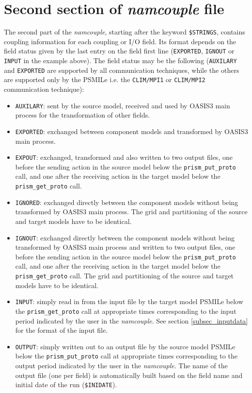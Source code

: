 \section{Second section of {\it namcouple} file }
\label{subsec_namcouplesecond}

The second part of the {\it namcouple}, starting after the keyword
{\tt \$STRINGS}, contains coupling information for each coupling or
I/O field.  Its format depends on the field status given by the last
entry on the field first line ({\tt EXPORTED}, {\tt IGNOUT} or {\tt
INPUT} in the example above). The field status may be the following
({\tt AUXILARY} and {\tt EXPORTED} are supported by all communication
techniques, while the others are supported only by the PSMILe i.e. the
{\tt CLIM/MPI1} or {\tt CLIM/MPI2} communication technique):

\begin{itemize}
\item {\tt AUXILARY}: sent by the source model, received and used by
  OASIS3 main process for the transformation of other fields.
\item {\tt EXPORTED}: exchanged between component models and
  transformed by OASIS3 main process.
\item {\tt EXPOUT}: exchanged, transformed and also written to two
  output files, one before the sending action in the source model
  below the {\tt prism\_put\_proto} call, and one after the receiving
  action in the target model below the {\tt prism\_get\_proto} call.
\item {\tt IGNORED}: exchanged directly between the component models
  without being transformed by OASIS3 main process. The grid and
  partitioning of the source and target models have to be
  identical.
\item {\tt IGNOUT}: exchanged directly between the component models
  without being transformed by OASIS3 main process and written to two
  output files, one before the sending action in the source model
  below the {\tt prism\_put\_proto} call, and one after the receiving
  action in the target model below the {\tt prism\_get\_proto} call.
  The grid and partitioning of the source and target models have to be
  identical.
\item {\tt INPUT}: simply read in from the input file by the target
  model PSMILe below the {\tt prism\_get\_proto} call at appropriate
  times corresponding to the input period indicated by the user in the
  {\it namcouple}. See section
  \ref{subsec_inputdata} for the format of the input file.
\item {\tt OUTPUT}: simply written out to an output file by the source
  model PSMILe below the {\tt prism\_put\_proto} call at appropriate
  times corresponding to the output period indicated by the user in
  the {\it namcouple}. The name of the output file (one per field) is
  automatically built based on the field name and initial date of the
  run ({\tt \$INIDATE}).

\end{itemize}

